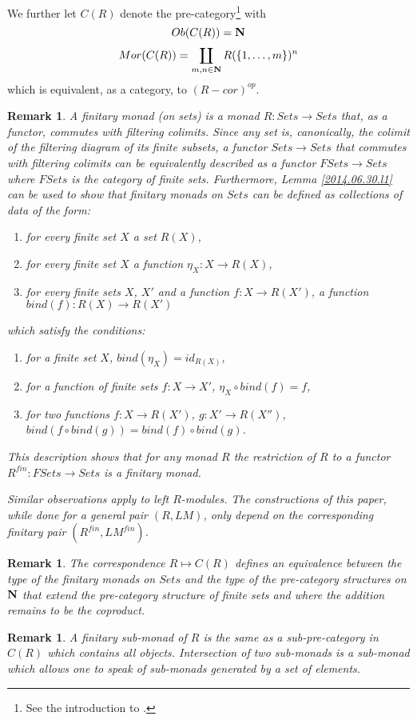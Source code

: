 \documentclass[11pt]{article}
\newtheorem{remark}[proposition]{Remark}
\newcommand{\sr}{\rightarrow}
\newcommand{\nn}{{\bf N\rm}}
\begin{document}
We further let $C(R)$ denote the pre-category\footnote{See the introduction to \cite{Csubsystems}.}  with 
%
%
$$Ob(C(R))=\nn$$
$$Mor(C(R))=\coprod_{m,n\in\nn} R(\{1,\dots,m\})^n$$
%
which is equivalent, as a category, to $(R-cor)^{op}$.
%
%
\begin{remark}\rm
A finitary monad (on sets) is a monad $R:Sets\sr Sets$ that, as a functor, commutes with filtering colimits. Since any set is, canonically, the colimit of the filtering diagram of its finite subsets, a functor $Sets \sr Sets$ that commutes with filtering colimits can be equivalently described as a functor $FSets \sr Sets$ where $FSets$ is the category of finite sets. Furthermore, Lemma \ref{2014.06.30.l1} can be used to show that finitary monads on $Sets$ can be defined as collections of data of the form:
%
\begin{enumerate}
\item for every finite set $X$ a set $R(X)$,
\item for every finite set $X$ a function $\eta_X: X \sr R(X)$,
\item for every finite sets $X$, $X'$ and a function $f:X\sr R(X')$, a function $ bind(f):R(X)\sr R(X')$
\end{enumerate}
%
which satisfy the conditions:
%
\begin{enumerate}
\item for a finite set $X$, $ bind(\eta_X)=id_{R(X)}$,
\item for a function of finite sets $f:X\sr X'$, $\eta_X\circ bind(f)=f$,
\item for two functions $f:X\sr R(X')$, $g:X'\sr R(X'')$, $ bind(f\circ bind(g))= bind(f)\circ bind(g)$.
\end{enumerate}
%
This description shows that for any monad $R$ the restriction of $R$ to a functor $R^{fin}:FSets\sr Sets$ is a finitary monad. 

Similar observations apply to left $R$-modules. The constructions of this paper, while done for a general pair $(R,LM)$, only depend on the corresponding finitary pair $(R^{fin},LM^{fin})$. 
\end{remark}
%
\begin{remark}\rm
The correspondence $R\mapsto C(R)$ defines an equivalence between the type of the finitary monads on $Sets$ and the type of the pre-category structures on $\nn$ that extend the pre-category structure of finite sets and where the addition remains to be the coproduct. 
\end{remark}
%
\begin{remark}\rm A finitary sub-monad of $R$ is the same as a sub-pre-category in $C(R)$ which contains all objects. Intersection of two sub-monads is a sub-monad which allows one to speak of sub-monads generated by a set of elements. 
\end{remark}
\end{document}
